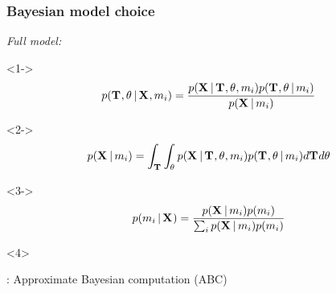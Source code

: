 \begin{frame}[t]
    \frametitle{Bayesian model choice}
    \begin{block}{\it Full model:}
        \begin{minipage}[c][3.8cm][c]{\linewidth}
            \begin{uncoverenv}<1->
            \[
                p(
                  \divTimeMapVector,
                  \allParameters{}
                  \given \alignmentVector, \divModel{i})
                  =
                \frac{
                    p(\alignmentVector \given
                      \divTimeMapVector,
                      \allParameters{},
                      \divModel{i}
                      )
                      p(
                        \divTimeMapVector,
                        \allParameters{}
                        \given \divModel{i}
                        )
                    }{p(\alignmentVector \given \divModel{i})}
            \]\vspace{-1mm}
            \end{uncoverenv}
            \begin{uncoverenv}<2->
            \[
                p(\alignmentVector \given \divModel{i}) =
                \int_{\divTimeMapVector} \int_{\allParameters{}}
                p(\alignmentVector \given \divTimeMapVector, \allParameters{}, \divModel{i})
                p(\divTimeMapVector, \allParameters{} \given \divModel{i})
                d\divTimeMapVector d\allParameters{}
            \]\vspace{-1mm}
            \end{uncoverenv}
            \begin{uncoverenv}<3->
            \[
                p(\divModel{i} \given \alignmentVector) =
                \frac{
                    p(\alignmentVector \given \divModel{i})
                    p(\divModel{i})
                }{
                    \sum_{i} p(\alignmentVector \given \divModel{i})
                    p(\divModel{i})
                }
            \]\vspace{-1mm}
            \end{uncoverenv}
        \end{minipage}
    \end{block}
    \vspace{1mm}
    \begin{uncoverenv}<4>
        \begin{center}
            \msb: Approximate Bayesian computation (ABC)

        \end{center}
    \end{uncoverenv}
\end{frame}

